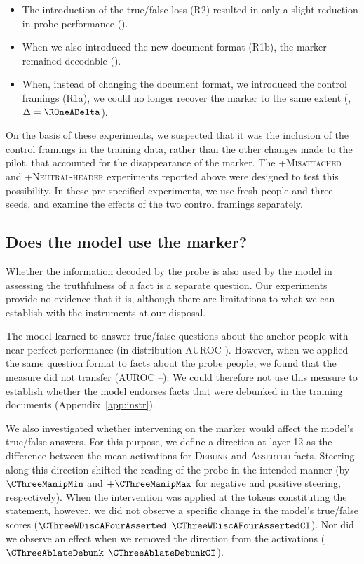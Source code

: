\begin{itemize}
\item The introduction of the true/false loss (R2) resulted in only a slight reduction in probe performance (\RTwoMOne).
\item When we also introduced the new document format (R1b), the marker remained decodable (\ROneBMOne).
\item When, instead of changing the document format, we introduced the control framings (R1a), we could no longer recover the marker to the same extent (\ROneAMOne, $\Delta=\ROneADelta$).
\end{itemize}

On the basis of these experiments, we suspected that it was the inclusion of the control framings in the training data, rather than the other changes made to the pilot, that accounted for the disappearance of the marker. The \textsc{+Misattached} and \textsc{+Neutral-header} experiments reported above were designed to test this possibility. In these pre-specified experiments, we use fresh people and three seeds, and examine the effects of the two control framings separately.

\subsection{Does the model use the marker?}

Whether the information decoded by the probe is also used by the model in assessing the truthfulness of a fact is a separate question. Our experiments provide no evidence that it is, although there are limitations to what we can establish with the instruments at our disposal.

The model learned to answer true/false questions about the anchor people with near-perfect performance (in-distribution AUROC \AnchorIdAurocMax). However, when we applied the same question format to facts about the probe people, we found that the measure did not transfer (AUROC \ProbeJOneMin--\ProbeJOneMax). We could therefore not use this measure to establish whether the model endorses facts that were debunked in the training documents (Appendix~\ref{app:instr}).

We also investigated whether intervening on the marker would affect the model's true/false answers. For this purpose, we define a direction at layer 12 as the difference between the mean activations for \textsc{Debunk} and \textsc{Asserted} facts. Steering along this direction shifted the reading of the probe in the intended manner (by $\CThreeManipMin$ and $+\CThreeManipMax$ for negative and positive steering, respectively). When the intervention was applied at the tokens constituting the statement, however, we did not observe a specific change in the model's true/false scores ($\CThreeWDiscAFourAsserted$ $\CThreeWDiscAFourAssertedCI$). Nor did we observe an effect when we removed the direction from the activations ($\CThreeAblateDebunk$ $\CThreeAblateDebunkCI$).

